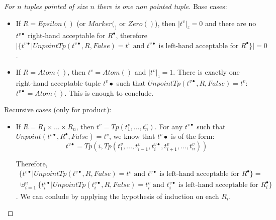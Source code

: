 \documentclass{article}
\newtheorem{proof}{Proof}
\begin{document}
\begin{proof}[For $n$ tuples pointed of size $n$ there is one non pointed tuple]
Base cases:
\begin{itemize}
	\item If $R = Epsilon()$ (or $Marker(_)$ or $Zero()$), then $|t^v|_z = 0$ and there are no $t^{v\bullet}$ right-hand acceptable for $R^{\bullet}$, therefore $|\{t^{v\bullet} | UnpointTp(t^{v\bullet}, R, False) = t^v \text{ and $t^{v\bullet}$ is left-hand acceptable for $R^{\bullet}$}\}| = 0$.

	\item If $R = Atom()$, then $t^v = Atom()$ and $|t^v|_z = 1$. There is exactly one right-hand acceptable tuple $t^v{\bullet}$ such that $UnpointTp(t^{v\bullet}, R, False) = t^v$: $t^{v\bullet} = Atom()$. This is enough to conclude.
\end{itemize}
Recursive cases (only for product):
\begin{itemize}
	\item If $R = R_1 \times ... \times R_n$, then $t^v = Tp(t^v_1, ..., t^v_n)$. For any $t^{v\bullet}$ such that $Unpoint(t^{v\bullet}, R^{\bullet}, False) = t^v$, we know that $t^v{\bullet}$ is of the form: $$t^{v\bullet} = Tp(i, Tp(t^v_1, ..., t^v_{i-1}, t^{v\bullet}_i, t^v_{i+1}, ..., t^v_n))$$

	Therefore,
	\begin{align*} \{t^{v\bullet} | UnpointTp(t^{v\bullet}, R, False) = t^v \text{ and $t^{v\bullet}$ is left-hand acceptable for $R^{\bullet}$}\} = \\ \displaystyle \uplus_{i=1}^n \{t^{v\bullet}_i | UnpointTp(t^{v\bullet}_i, R, False) = t^v_i \text{ and $t^{v\bullet}_i$ is left-hand acceptable for $R_i^{\bullet}$}\}
	\end{align*}. We can conlude by applying the hypothesis of induction on each $R_i$.
\end{itemize}
\end{proof}
\end{document}
